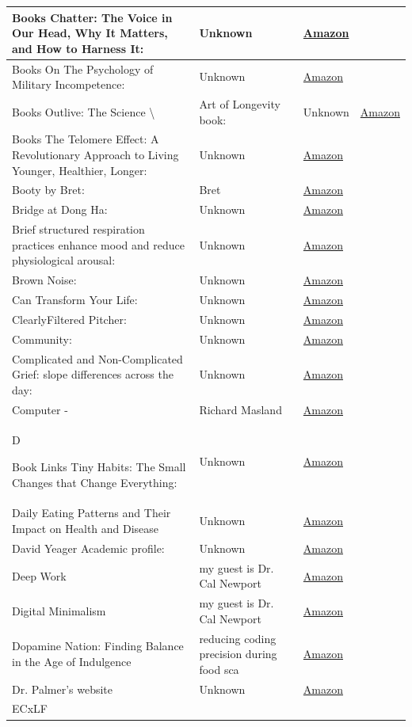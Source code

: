\documentclass{article}
\begin{document}
\begin{longtable}{|p{8cm}|p{4cm}|p{2.5cm}|}
\hline
Books
Chatter: The Voice in Our Head, Why It Matters, and How to Harness It: & Unknown & \href{https://amzn.to/3QaS0Nw}{Amazon} \\
\hline
Books
On The Psychology of Military Incompetence: & Unknown & \href{https://amzn.to/3RCRk3R}{Amazon} \\
\hline
Books
Outlive: The Science \textbackslash{}& Art of Longevity book: & Unknown & \href{https://amzn.to/47TJ6tQ}{Amazon} \\
\hline
Books
The Telomere Effect: A Revolutionary Approach to Living Younger, Healthier, Longer: & Unknown & \href{https://amzn.to/3m4zERB}{Amazon} \\
\hline
Booty by Bret: & Bret & \href{https://amzn.to/4pwQHaG}{Amazon} \\
\hline
Bridge at Dong Ha: & Unknown & \href{https://amzn.to/4cQuyxJ}{Amazon} \\
\hline
Brief structured respiration practices enhance mood and reduce physiological arousal: & Unknown & \href{https://amzn.to/3RwnhdV}{Amazon} \\
\hline
Brown Noise: & Unknown & \href{https://amzn.to/3wzvfrV}{Amazon} \\
\hline
Can Transform Your Life: & Unknown & \href{https://amzn.to/3Kailra}{Amazon} \\
\hline
ClearlyFiltered Pitcher: & Unknown & \href{https://amzn.to/3mrs0AG}{Amazon} \\
\hline
Community: & Unknown & \href{https://amzn.to/3FiU7Zm}{Amazon} \\
\hline
Complicated and Non-Complicated Grief: slope differences across the day: & Unknown & \href{https://amzn.to/3t4oYCK}{Amazon} \\
\hline
Computer - & Richard Masland & \href{https://amzn.to/3lZWrL4}{Amazon} \\
\hline
D

Book Links
Tiny Habits: The Small Changes that Change Everything: & Unknown & \href{https://amzn.to/3NreMMr}{Amazon} \\
\hline
Daily Eating Patterns and Their Impact on Health and Disease & Unknown & \href{https://amzn.to/3FixpAv}{Amazon} \\
\hline
David Yeager
Academic profile: & Unknown & \href{https://amzn.to/3VYd9xl}{Amazon} \\
\hline
Deep Work & my guest is Dr. Cal Newport & \href{https://amzn.to/3wNR6yV}{Amazon} \\
\hline
Digital Minimalism & my guest is Dr. Cal Newport & \href{https://amzn.to/48IYJ6U}{Amazon} \\
\hline
Dopamine Nation: Finding Balance in the Age of Indulgence & reducing coding precision during food sca & \href{https://amzn.to/3ipnI7o}{Amazon} \\
\hline
Dr. Palmer’s website & Unknown & \href{https://amzn.to/3XheFIV}{Amazon} \\
\hline
ECxLF


\end{longtable}
\end{document}
